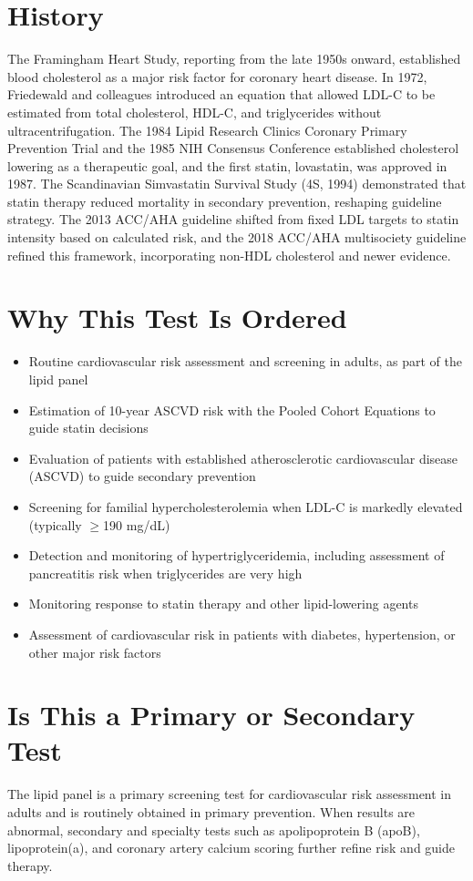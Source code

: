 \section*{History}
The Framingham Heart Study, reporting from the late 1950s onward, established blood cholesterol as a major risk factor for coronary heart disease. In 1972, Friedewald and colleagues introduced an equation that allowed LDL-C to be estimated from total cholesterol, HDL-C, and triglycerides without ultracentrifugation. The 1984 Lipid Research Clinics Coronary Primary Prevention Trial and the 1985 NIH Consensus Conference established cholesterol lowering as a therapeutic goal, and the first statin, lovastatin, was approved in 1987. The Scandinavian Simvastatin Survival Study (4S, 1994) demonstrated that statin therapy reduced mortality in secondary prevention, reshaping guideline strategy. The 2013 ACC/AHA guideline shifted from fixed LDL targets to statin intensity based on calculated risk, and the 2018 ACC/AHA multisociety guideline refined this framework, incorporating non-HDL cholesterol and newer evidence.
\section*{Why This Test Is Ordered}
\begin{itemize}
  \item Routine cardiovascular risk assessment and screening in adults, as part of the lipid panel
  \item Estimation of 10-year ASCVD risk with the Pooled Cohort Equations to guide statin decisions
  \item Evaluation of patients with established atherosclerotic cardiovascular disease (ASCVD) to guide secondary prevention
  \item Screening for familial hypercholesterolemia when LDL-C is markedly elevated (typically $\geq$190 mg/dL)
  \item Detection and monitoring of hypertriglyceridemia, including assessment of pancreatitis risk when triglycerides are very high
  \item Monitoring response to statin therapy and other lipid-lowering agents
  \item Assessment of cardiovascular risk in patients with diabetes, hypertension, or other major risk factors
\end{itemize}
\section*{Is This a Primary or Secondary Test}
The lipid panel is a primary screening test for cardiovascular risk assessment in adults and is routinely obtained in primary prevention. When results are abnormal, secondary and specialty tests such as apolipoprotein B (apoB), lipoprotein(a), and coronary artery calcium scoring further refine risk and guide therapy.
